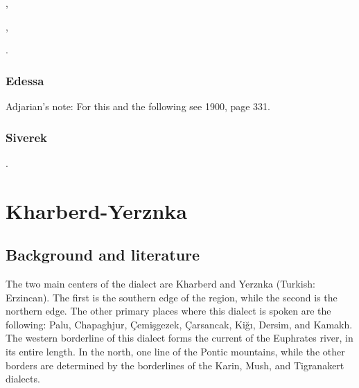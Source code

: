 \begin{adjarianpage}\label{page:166}\end{adjarianpage}%

,

,

.



\subsection{Edessa}

Adjarian's note: For this and the following see  1900, page 331. 


\subsection{Siverek}

.

\fussy

\chapter{Kharberd-Yerznka} \label{chapter:Kharberd-Yerznka}

\section{Background and literature}
\begin{adjarianpage}\label{page:167}\end{adjarianpage}%

The two main centers of the dialect are Kharberd and Yerznka (Turkish: Erzincan). The first is the southern edge of the region, while the second is the northern edge. The other primary places where this dialect is spoken are the following: Palu, Chapaghjur, Çemişgezek, Çarsancak, Kiğı, Dersim, and Kamakh. The western borderline of this dialect forms the current of the Euphrates river, in its entire length. In the north, one line of the Pontic mountains, while the other borders are determined by the borderlines of the Karin, Mush, and Tigranakert dialects. 

